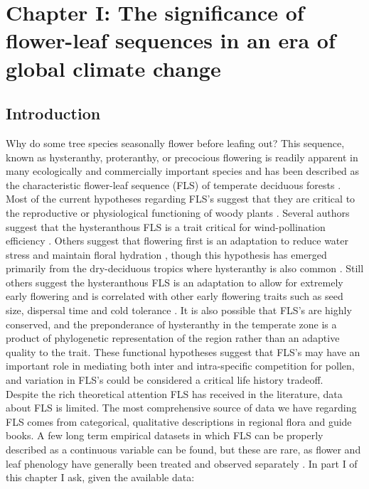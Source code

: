 \documentclass{article}\usepackage[]{graphicx}\usepackage[]{color}
\begin{document}
\section*{Chapter I: The significance of flower-leaf sequences in an era of global climate change}
\subsection*{Introduction}
\indent\indent Why do some tree species seasonally flower before leafing out? This sequence, known as hysteranthy, proteranthy, or precocious flowering is readily apparent in many ecologically and commercially important species and has been described as  the characteristic flower-leaf sequence (FLS) of temperate deciduous forests \citep{Rathcke1985}. Most of the current hypotheses regarding FLS's suggest that they are critical to the reproductive or physiological functioning of woody plants \citep{Gougherty2018}. Several authors suggest that the hysteranthous FLS is a trait critical for wind-pollination efficiency \citep{Whitehead1969,Friedman2009}. Others suggest that flowering first is an adaptation to reduce water stress and maintain floral hydration \citep{Franklin2016}, though this hypothesis has emerged primarily from the dry-deciduous tropics where hysteranthy is also common \citep{Janzen1967,Franklin2016}.  Still others suggest the hysteranthous FLS is an adaptation to allow for extremely early flowering and is correlated with other early flowering traits such as seed size, dispersal time and cold tolerance \citep{Gougherty2018,Bolmgren2003,Primack1987}. It is also possible that FLS's are highly conserved, and the preponderance of hysteranthy in the temperate zone is a product of phylogenetic representation of the region rather than an adaptive quality to the trait. These functional hypotheses suggest that FLS's may have an important role in mediating both inter and intra-specific competition for pollen, and variation in FLS's could be considered a critical life history tradeoff. \\
\indent Despite the rich theoretical attention FLS has received in the literature, data about FLS is limited. The most comprehensive source of data we have regarding FLS comes from categorical, qualitative descriptions in regional flora and guide books. A few long term empirical datasets in which FLS can be properly described as a continuous variable can be found, but these are rare, as flower and leaf phenology have generally been treated and observed separately \citep{Wolkovich2014}. In part I of this chapter I ask, given the available data:
\end{document}
